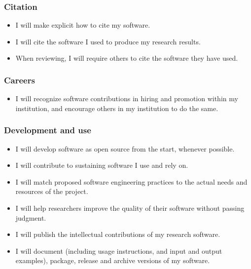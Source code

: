 \documentclass[a4paper,UKenglish]{dagman}
\renewcommand{\paragraph}[1]{\subsubsection*{#1}\xspace}
\begin{document}
\paragraph{Citation}
\begin{itemize}
\item I will make explicit how to cite my software.
\item I will cite the software I used to produce my research results.
\item When reviewing, I will require others to cite the software they have used.
\end{itemize}

\paragraph{Careers}
\begin{itemize}
\item I will recognize software contributions in hiring and promotion within my institution, and encourage others in my institution to do the same.
\end{itemize}

\paragraph{Development and use}
\begin{itemize}
\item I will develop software as open source from the start, whenever possible.
\item I will contribute to sustaining software I use and rely on.
\item I will match proposed software engineering practices to the actual needs and resources of the project.
\item I will help researchers improve the quality of their software without passing judgment.
\item I will publish the intellectual contributions of my research software.
\item I will document (including usage instructions, and input and output examples), package, release and archive versions of my software.
\end{itemize}
\end{document}
